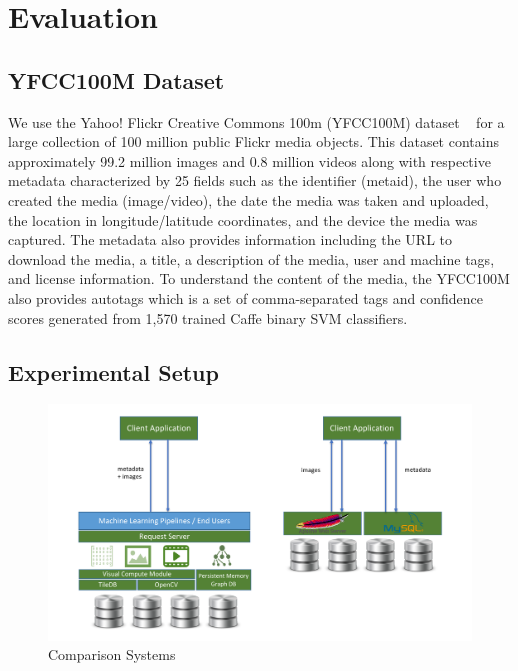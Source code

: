\section{Evaluation}
\label{eval}

\subsection{YFCC100M Dataset}
\label{dataset}

We use the Yahoo! Flickr Creative Commons 100m (YFCC100M) dataset ~\cite{Thomee_2016} for a large collection of 100 million public Flickr media objects.  This dataset contains approximately 99.2 million images and 0.8 million videos along with respective metadata characterized by 25 fields such as the identifier (metaid), the user who created the media (image/video), the date the media was taken and uploaded, the location in longitude/latitude coordinates, and the device the media was captured.  The metadata also provides information including the URL to download the media, a title, a description of the media, user and machine tags, and license information.  To understand the content of the media, the YFCC100M also provides autotags which is a set of comma-separated tags and confidence scores generated from 1,570 trained Caffe binary SVM classifiers.  

\subsection{Experimental Setup}

\begin{figure}[]
\centering
\includegraphics[width=\textwidth]{figures/comparison_system}
\caption{Comparison Systems}
\label{fig:systems}
\end{figure}

